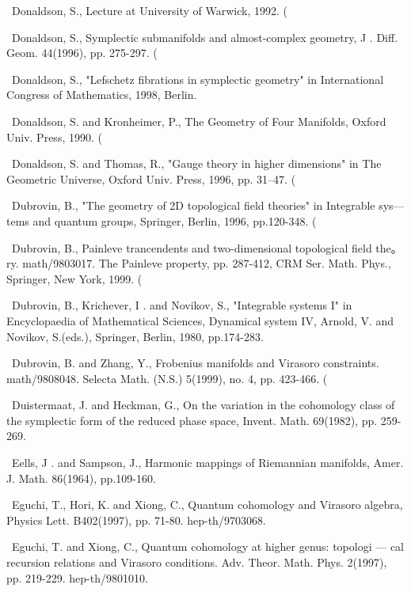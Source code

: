 {\noindent [76]\ Donaldson, S., Lecture at University of Warwick, 1992. (\par\smallskip
\noindent [77]\ Donaldson, S., Symplectic submanifolds and almost-complex geometry, J . Diff. Geom. 44(1996), pp. 275-297. (\par\smallskip
\noindent [78]\ Donaldson, S., "Lefschetz fibrations in symplectic geometry" in International Congress of Mathematics, 1998, Berlin.\par\smallskip
\noindent [79]\ Donaldson, S. and Kronheimer, P., The Geometry of Four Manifolds, Oxford Univ. Press, 1990. (\par\smallskip
\noindent [80]\ Donaldson, S. and Thomas, R., "Gauge theory in higher dimensions" in The Geometric Universe, Oxford Univ. Press, 1996, pp. 31--47. (\par\smallskip
\noindent [81]\ Dubrovin, B., "The geometry of 2D topological field theories" in Integrable sys— tems and quantum groups, Springer, Berlin, 1996, pp.120-348. (\par\smallskip
\noindent [82]\ Dubrovin, B., Painleve trancendents and two-dimensional topological field the。ry. math/9803017. The Painleve property, pp. 287-412, CRM Ser. Math. Phys., Springer, New York, 1999. (\par\smallskip
\noindent [83]\ Dubrovin, B., Krichever, I . and Novikov, S., "Integrable systems I" in Encyclopaedia of Mathematical Sciences, Dynamical system IV, Arnold, V. and Novikov, S.(eds.), Springer, Berlin, 1980, pp.174-283.\par\smallskip
\noindent [84]\ Dubrovin, B. and Zhang, Y., Frobenius manifolds and Virasoro constraints. math/9808048. Selecta Math. (N.S.) 5(1999), no. 4, pp. 423-466. (\par\smallskip
\noindent [85]\ Duistermaat, J. and Heckman, G., On the variation in the cohomology class of the symplectic form of the reduced phase space, Invent. Math. 69(1982), pp. 259-269.\par\smallskip
\noindent [86]\ Eells, J . and Sampson, J., Harmonic mappings of Riemannian manifolds, Amer. J. Math. 86(1964), pp.109-160.\par\smallskip
\noindent [87]\ Eguchi, T., Hori, K. and Xiong, C., Quantum cohomology and Virasoro algebra, Physics Lett. B402(1997), pp. 71-80. hep-th/9703068.\par\smallskip
\noindent [88]\ Eguchi, T. and Xiong, C., Quantum cohomology at higher genus: topologi — cal recursion relations and Virasoro conditions. Adv. Theor. Math. Phys. 2(1997), pp. 219-229. hep-th/9801010.\par\smallskip
}
